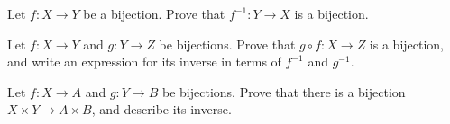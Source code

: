 \begin{exercise}
\label{exInverseBijection}
Let $f : X \to Y$ be a bijection. Prove that $f^{-1} : Y \to X$ is a bijection.
\end{exercise}

\begin{exercise}
\label{exCompositeBijection}
Let $f : X \to Y$ and $g : Y \to Z$ be bijections. Prove that $g \circ f : X \to Z$ is a bijection, and write an expression for its inverse in terms of $f^{-1}$ and $g^{-1}$.
\end{exercise}

\begin{exercise}
Let $f : X \to A$ and $g : Y \to B$ be bijections. Prove that there is a bijection $X \times Y \to A \times B$, and describe its inverse.
\end{exercise}
